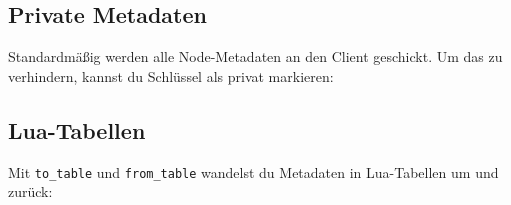 \begin{Shaded}
\begin{Highlighting}[]
  \OperatorTok{=} \OperatorTok{\{}  \OperatorTok{=} \OperatorTok{,}  \OperatorTok{=}  \OperatorTok{\}}
\OperatorTok{:}\OperatorTok{(}\OperatorTok{,} \OperatorTok{(}\OperatorTok{))}

 \OperatorTok{=} \OperatorTok{(}\OperatorTok{:}\OperatorTok{(}\OperatorTok{))}
\end{Highlighting}
\end{Shaded}

\subsection{Private Metadaten}\label{private-metadaten}

Standardmäßig werden alle Node-Metadaten an den Client geschickt. Um das
zu verhindern, kannst du Schlüssel als privat markieren:

\begin{Shaded}
\begin{Highlighting}[]
\OperatorTok{:}\OperatorTok{(}\OperatorTok{,} \OperatorTok{)}
\OperatorTok{:}\OperatorTok{(}\OperatorTok{)}
\end{Highlighting}
\end{Shaded}

\subsection{Lua-Tabellen}\label{lua-tabellen}

Mit \texttt{to\_\allowbreak{}table} und
\texttt{from\_\allowbreak{}table} wandelst du Metadaten in Lua-Tabellen
um und zurück:

\begin{Shaded}
\begin{Highlighting}[]
  \OperatorTok{=} \OperatorTok{:}\OperatorTok{()}
 \OperatorTok{=} 
\OperatorTok{:}\OperatorTok{(}\OperatorTok{)}
\end{Highlighting}
\end{Shaded}


